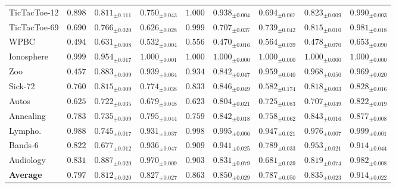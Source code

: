 \documentclass[times, review, 10pt]{elsarticle}
\begin{document}
\begin{table}[t]
{\begin{tabular}{lccccccc c}
TicTacToe-12 & $0.898$ & $0.811_{\pm0.111}$ & $0.750_{\pm0.043}$ & $\mathbf{1.000}$ & $0.938_{\pm0.004}$ & $0.694_{\pm0.067}$ & $0.823_{\pm0.009}$ & $0.990_{\pm0.003}$ \\
TicTacToe-69 & $0.690$ & $0.766_{\pm0.020}$ & $0.626_{\pm0.028}$ & $\mathbf{0.999}$ & $0.707_{\pm0.037}$ & $0.739_{\pm0.042}$ & $0.815_{\pm0.010}$ & $0.981_{\pm0.018}$ \\
WPBC         & $0.494$ & $0.631_{\pm0.008}$ & $0.532_{\pm0.004}$ & $0.556$ & $0.470_{\pm0.016}$ & $0.564_{\pm0.039}$ & $0.478_{\pm0.070}$ & $\mathbf{0.653}_{\pm0.090}$ \\
Ionosphere   & $0.999$ & $0.954_{\pm0.017}$ & $\mathbf{1.000}_{\pm0.001}$ & $\mathbf{1.000}$ & $\mathbf{1.000}_{\pm0.000}$ & $\mathbf{1.000}_{\pm0.000}$ & $\mathbf{1.000}_{\pm0.000}$ & $\mathbf{1.000}_{\pm0.000}$ \\
Zoo          & $0.457$ & $0.883_{\pm0.009}$ & $0.939_{\pm0.064}$ & $0.934$ & $0.842_{\pm0.047}$ & $0.959_{\pm0.040}$ & $0.968_{\pm0.050}$ & $\mathbf{0.969}_{\pm0.020}$ \\
Sick-72      & $0.760$ & $0.815_{\pm0.009}$ & $0.774_{\pm0.038}$ & $0.833$ & $\mathbf{0.846}_{\pm0.049}$ & $0.582_{\pm0.174}$ & $0.818_{\pm0.003}$ & $0.828_{\pm0.016}$ \\
Autos        & $0.625$ & $0.722_{\pm0.035}$ & $0.679_{\pm0.048}$ & $0.623$ & $0.804_{\pm0.021}$ & $0.725_{\pm0.083}$ & $0.707_{\pm0.049}$ & $\mathbf{0.822}_{\pm0.019}$ \\
Annealing    & $0.783$ & $0.735_{\pm0.009}$ & $0.795_{\pm0.044}$ & $0.759$ & $0.842_{\pm0.018}$ & $0.758_{\pm0.062}$ & $0.843_{\pm0.016}$ & $\mathbf{0.877}_{\pm0.008}$ \\
Lympho.      & $0.988$ & $0.745_{\pm0.017}$ & $0.931_{\pm0.037}$ & $0.998$ & $0.995_{\pm0.006}$ & $0.947_{\pm0.021}$ & $0.976_{\pm0.007}$ & $\mathbf{0.999}_{\pm0.001}$ \\
Bands-6      & $0.822$ & $0.677_{\pm0.012}$ & $0.936_{\pm0.047}$ & $0.909$ & $0.941_{\pm0.025}$ & $0.789_{\pm0.033}$ & $\mathbf{0.953}_{\pm0.021}$ & $0.914_{\pm0.044}$ \\
Audiology    & $0.831$ & $0.887_{\pm0.020}$ & $0.970_{\pm0.009}$ & $0.903$ & $0.831_{\pm0.079}$ & $0.681_{\pm0.039}$ & $0.819_{\pm0.074}$ & $\mathbf{0.982}_{\pm0.008}$ \\
\midrule
\textbf{Average} & $0.797$ & $0.812_{\pm0.020}$ & $0.827_{\pm0.027}$ & $0.863$ & $0.850_{\pm0.029}$ & $0.787_{\pm0.050}$ & $0.835_{\pm0.023}$ & $\mathbf{0.914}_{\pm0.022}$ \\
\bottomrule
\end{tabular}
}
\end{table}
\end{document}

